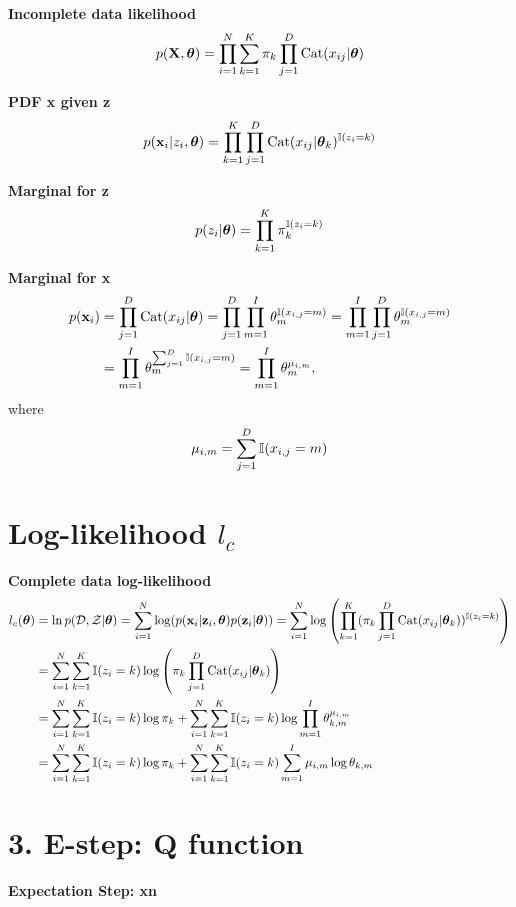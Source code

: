 \documentclass[12pt]{article}
\begin{document}
\textbf{Incomplete data likelihood}
\begin{equation}
    p(\mathbf{X},\boldsymbol\theta) = \prod_{i=1}^{N}\sum_{k=1}^{K}\pi_k\prod_{j=1}^{D}\operatorname{\operatorname{Cat}}(x_{ij}|\boldsymbol\theta)
\end{equation}

\textbf{PDF x given z}
\begin{equation}
p(\mathbf{x}_i|z_i,\boldsymbol\theta) = \prod_{k=1}^{K}\prod_{j=1}^{D}\operatorname{\operatorname{Cat}}(x_{ij}|\boldsymbol\theta_k)^{\mathbb{I} (z_i=k)}
\end{equation}

\textbf{Marginal for z}
\begin{equation}
    p(z_i|\boldsymbol\theta) = \prod_{k=1}^{K}\pi_k^{\mathbb{I} (z_i=k)}
\end{equation}

\textbf{Marginal for x}
\begin{align}
    p(\mathbf{x}_i) & = \prod_{j=1}^D\operatorname{\operatorname{Cat}}(x_{ij}|\boldsymbol\theta) = \prod_{j=1}^D\prod_{m=1}^I\theta_m^{\mathbb{I}(x_{i,j}=m)} = \prod_{m=1}^I\prod_{j=1}^D\theta_m^{\mathbb{I}(x_{i,j}=m)} \\
    & = \prod_{m=1}^I\theta_m^{\sum_{j=1}^D {\mathbb{I}(x_{i,j}=m)}} = \prod_{m=1}^I \theta_m^{\mu_{i,m}},
\end{align}
where
\begin{equation}
    \mu_{i,m} = \sum_{j=1}^D {\mathbb{I}(x_{i,j}=m)}
\end{equation}

\section{Log-likelihood $l_c$}
\textbf{Complete data log-likelihood}
\begin{align}
    l_c(\boldsymbol\theta) & = \ln p(\mathcal{D},\mathcal{Z}|\boldsymbol\theta) = \sum_{i=1}^{N}\log (p(\mathbf{x}_i|\mathbf{z}_i,\boldsymbol\theta) p(\mathbf{z}_i|\boldsymbol\theta)) =  \sum_{i=1}^{N}\log \left(\prod_{k=1}^K(\pi_k\prod_{j=1}^D \operatorname{\operatorname{Cat}}(x_{ij}|\boldsymbol\theta_k))^{\mathbb{I} (z_i=k)}\right)\\
    & = \sum_{i=1}^N\sum_{k=1}^K\mathbb{I} (z_i=k) \log\left( \pi_k\prod_{j=1}^D\operatorname{\operatorname{Cat}}(x_{ij}|\boldsymbol\theta_k)\right) \\
    & =  \sum_{i=1}^N\sum_{k=1}^K\mathbb{I} (z_i=k) \log \pi_k + \sum_{i=1}^N\sum_{k=1}^K\mathbb{I} (z_i=k) \log \prod_{m=1}^I \theta_{k,m}^{\mu_{i,m}}\\
    & = \sum_{i=1}^N\sum_{k=1}^K\mathbb{I} (z_i=k) \log \pi_k + \sum_{i=1}^N\sum_{k=1}^K\mathbb{I} (z_i=k) \sum_{m=1}^I \mu_{i,m}\log \theta_{k,m}
    \end{align}
    
   
\section{3. E-step: Q function}
\textbf{Expectation Step: xn}\\
\end{document}
